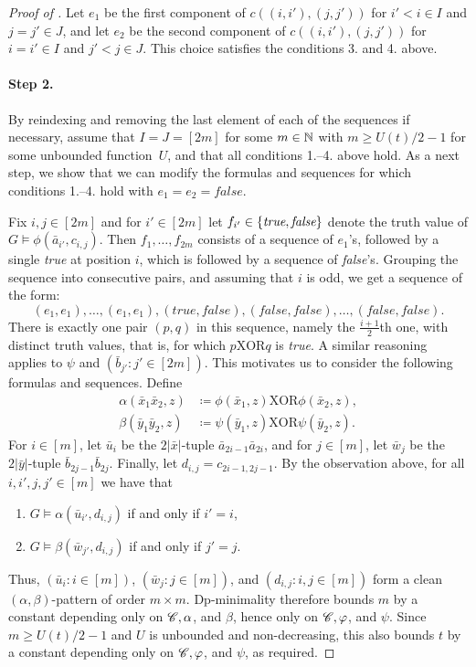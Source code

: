 \begin{proof}[Proof of ]
Let $e_1$ be the first component of $c((i,i'),(j,j'))$ for  $i'<i\in I$ and $j=j'\in J$,
and let $e_2$ be the second component of $c((i,i'),(j,j'))$
for $i=i'\in I$ and $j'<j\in J$. This choice satisfies the conditions 3. and 4. above.




\paragraph{Step 2.}
By reindexing and removing the last element of each of the sequences if necessary, 
assume that $I=J=[2m]$ for some $m\in\mathbb N$ with $m\ge U(t)/2-1$ for some unbounded function~$U$, and that all conditions 1.--4. above hold.
As a next step, we show that we can modify the formulas and sequences for which conditions 1.--4. hold with $e_1=e_2=\textit{false}$.


Fix $i,j\in [2m]$
and for $i'\in [2m]$ let $f_{i'}\in\{\textit{true}, \textit{false}\}$ denote the truth value 
of $G\models \phi(\bar a_{i'},c_{i,j})$.
Then $f_1,\ldots,f_{2m}$ 
consists of a sequence of $e_1$'s, followed by a single \emph{true} at position $i$, which is followed by a sequence of \emph{false}'s.
Grouping the sequence into consecutive pairs,
and assuming that $i$ is odd,
we get a sequence of the form:
$$(e_1,e_1),\ldots,(e_1,e_1),(\textit{true},\textit{false}),(\textit{false},\textit{false}),\ldots, (\textit{false},\textit{false}).$$
There is exactly one pair $(p,q)$ in this sequence, namely the $\frac{i+1}2$th one, with distinct truth values,
that is, for which $p\mathbin{\mathrm{XOR}}q$ is \emph{true}. A similar reasoning applies to $\psi$ and $(\bar b_{j'}:j'\in [2m])$.
This motivates us to consider the following formulas and sequences. Define
\begin{align*}
\alpha(\bar x_1\bar x_2,z)&\coloneqq \phi(\bar x_1,z)\mathbin{\mathrm{XOR}} \phi(\bar x_2,z),\\
\beta(\bar y_1\bar y_2,z)&\coloneqq \psi(\bar y_1,z)\mathbin{\mathrm{XOR}} \psi(\bar y_2,z).
\end{align*}
For $i\in[m]$, 
let $\bar u_i$ be the $2|\bar x|$-tuple 
 $\bar a_{2i-1}\bar a_{2i}$,
 and for $j\in[m]$, let $\bar w_j$
 be the $2|\bar y|$-tuple $\bar b_{2j-1}\bar b_{2j}$.
 Finally, let $d_{i,j}=c_{2i-1,2j-1}$.
 By the observation above,
 for all $i,i',j,j'\in[m]$ we have that 
 \begin{enumerate}[label=(\textit{\alph*}),ref=(\textit{\alph*})]
    \item\label{item:pattern-alpha} $G\models \alpha(\bar u_{i'},d_{i,j})$ if and only if $i'=i$,
    \item\label{item:pattern-beta} $G\models \beta(\bar w_{j'},d_{i,j})$ if and only if $j'=j$.
 \end{enumerate}

Thus, $(\bar u_i:i\in[m])$, $(\bar w_j:j\in[m])$, and $(d_{i,j}:i,j\in[m])$ form a clean $(\alpha,\beta)$-pattern of order $m\times m$.
Dp-minimality therefore bounds $m$ by a constant depending only on $\mathscr C,\alpha$, and $\beta$, hence only on $\mathscr C,\varphi$, and $\psi$.
Since $m\ge U(t)/2-1$ and $U$ is unbounded and non-decreasing, this also bounds $t$ by a constant depending only on $\mathscr C,\varphi$, and $\psi$, as required.
\end{proof}

